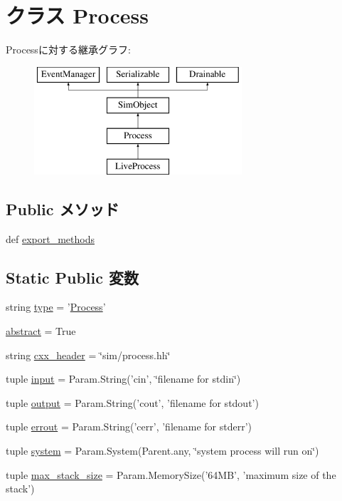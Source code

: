 \hypertarget{classProcess_1_1Process}{
\section{クラス Process}
\label{classProcess_1_1Process}
}
Processに対する継承グラフ:\begin{figure}[H]
\begin{center}
\leavevmode
\includegraphics[height=4cm]{classProcess_1_1Process}
\end{center}
\end{figure}
\subsection*{Public メソッド}
\begin{DoxyCompactItemize}
\item 
def \hyperlink{classProcess_1_1Process_ab373c5eaef9a7b80491a097389260f4a}{export\_\-methods}
\end{DoxyCompactItemize}
\subsection*{Static Public 変数}
\begin{DoxyCompactItemize}
\item 
string \hyperlink{classProcess_1_1Process_acce15679d830831b0bbe8ebc2a60b2ca}{type} = '\hyperlink{classProcess_1_1Process}{Process}'
\item 
\hyperlink{classProcess_1_1Process_a17fa61ac3806b481cafee5593b55e5d0}{abstract} = True
\item 
string \hyperlink{classProcess_1_1Process_a17da7064bc5c518791f0c891eff05fda}{cxx\_\-header} = \char`\"{}sim/process.hh\char`\"{}
\item 
tuple \hyperlink{classProcess_1_1Process_a87f26bd4366753f69c0fdbf3c87080c9}{input} = Param.String('cin', \char`\"{}filename for stdin\char`\"{})
\item 
tuple \hyperlink{classProcess_1_1Process_acf316e258896197f4e917a6547e49532}{output} = Param.String('cout', 'filename for stdout')
\item 
tuple \hyperlink{classProcess_1_1Process_a5de99c4e0673c09518ff846607e63cbb}{errout} = Param.String('cerr', 'filename for stderr')
\item 
tuple \hyperlink{classProcess_1_1Process_ab737471139f5a296e5b26e8a0e1b0744}{system} = Param.System(Parent.any, \char`\"{}system process will run on\char`\"{})
\item 
tuple \hyperlink{classProcess_1_1Process_a33b435349032a80699ab37d8b10ff10b}{max\_\-stack\_\-size} = Param.MemorySize('64MB', 'maximum size of the stack')
\end{DoxyCompactItemize}


